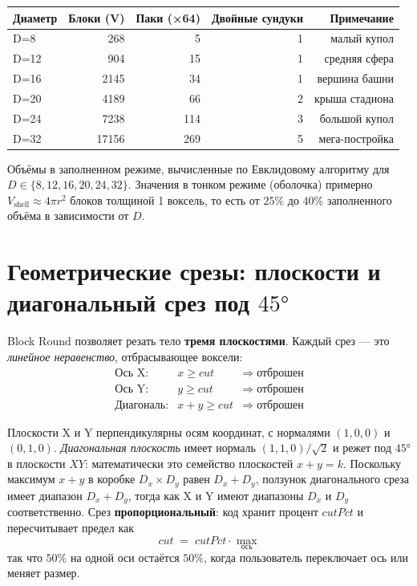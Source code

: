 \documentclass[12pt,a4paper]{scrartcl}
\newcommand{\acc}[1]{\textcolor{accent}{\textbf{#1}}}
\begin{document}
\vspace{0.5em}
\begin{center}
\begin{tabular}{@{}lrrrr@{}}
\toprule
\textbf{Диаметр} & \textbf{Блоки (V)} & \textbf{Паки (×64)} & \textbf{Двойные сундуки} & \textbf{Примечание} \\
\midrule
D=8   &   268 &  5  & 1 & малый купол  \\
D=12  &   904 & 15  & 1 & средняя сфера \\
D=16  &  2145 & 34  & 1 & вершина башни \\
D=20  &  4189 & 66  & 2 & крыша стадиона \\
D=24  &  7238 & 114 & 3 & большой купол \\
D=32  & 17156 & 269 & 5 & мега-постройка \\
\bottomrule
\end{tabular}
\end{center}

Объёмы в заполненном режиме, вычисленные по Евклидовому алгоритму для $D \in \{8,12,16,20,24,32\}$. Значения в тонком режиме (оболочка) примерно $V_{\mathrm{shell}} \approx 4\pi r^2$ блоков толщиной 1 воксель, то есть от $25\%$ до $40\%$ заполненного объёма в зависимости от $D$.

\section{Геометрические срезы: плоскости и диагональный срез под $45°$}

Block Round позволяет резать тело \acc{тремя плоскостями}. Каждый срез — это \emph{линейное неравенство}, отбрасывающее воксели:
\[
\begin{array}{lcl}
\text{Ось X:}    & x \geq \mathit{cut}      & \Rightarrow\; \text{отброшен} \\
\text{Ось Y:}    & y \geq \mathit{cut}      & \Rightarrow\; \text{отброшен} \\
\text{Диагональ:}  & x + y \geq \mathit{cut}  & \Rightarrow\; \text{отброшен}
\end{array}
\]

Плоскости X и Y перпендикулярны осям координат, с нормалями $(1,0,0)$ и $(0,1,0)$. \emph{Диагональная плоскость} имеет нормаль $(1,1,0)/\sqrt{2}$ и режет под $45°$ в плоскости $XY$: математически это семейство плоскостей $x+y = k$. Поскольку максимум $x+y$ в коробке $D_x \times D_y$ равен $D_x + D_y$, ползунок диагонального среза имеет диапазон $D_x + D_y$, тогда как X и Y имеют диапазоны $D_x$ и $D_y$ соответственно. Срез \acc{пропорциональный}: код хранит процент $\mathit{cutPct}$ и пересчитывает предел как
\[
\mathit{cut} \;=\; \mathit{cutPct} \cdot \max_{\text{ось}}
\]
так что $50\%$ на одной оси остаётся $50\%$, когда пользователь переключает ось или меняет размер.
\end{document}
